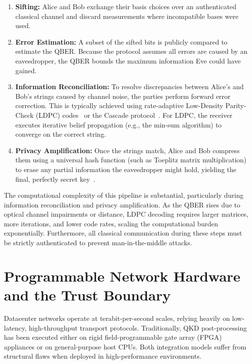 \begin{enumerate}
    \item \textbf{Sifting:} Alice and Bob exchange their basis choices over an authenticated classical channel and discard measurements where incompatible bases were used.
    \item \textbf{Error Estimation:} A subset of the sifted bits is publicly compared to estimate the QBER. Because the protocol assumes all errors are caused by an eavesdropper, the QBER bounds the maximum information Eve could have gained.
    \item \textbf{Information Reconciliation:} To resolve discrepancies between Alice's and Bob's strings caused by channel noise, the parties perform forward error correction. This is typically achieved using rate-adaptive Low-Density Parity-Check (LDPC) codes~\cite{elkouss2011reconciliation} or the Cascade protocol~\cite{brassard1994cascade}. For LDPC, the receiver executes iterative belief propagation (e.g., the min-sum algorithm) to converge on the correct string.
    \item \textbf{Privacy Amplification:} Once the strings match, Alice and Bob compress them using a universal hash function (such as Toeplitz matrix multiplication) to erase any partial information the eavesdropper might hold, yielding the final, perfectly secret key~\cite{bennett1995privacy}.
\end{enumerate}

The computational complexity of this pipeline is substantial, particularly during information reconciliation and privacy amplification. As the QBER rises due to optical channel impairments or distance, LDPC decoding requires larger matrices, more iterations, and lower code rates, scaling the computational burden exponentially. Furthermore, all classical communication during these steps must be strictly authenticated to prevent man-in-the-middle attacks.

\section{Programmable Network Hardware and the Trust Boundary}
\label{sec:qkd-dpu-trust}

Datacenter networks operate at terabit-per-second scales, relying heavily on low-latency, high-throughput transport protocols. Traditionally, QKD post-processing has been executed either on rigid field-programmable gate array (FPGA) appliances or on general-purpose host CPUs. Both integration models suffer from structural flaws when deployed in high-performance environments.

